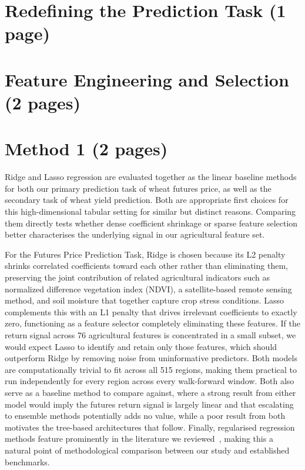 \documentclass[pdflatex,sn-mathphys-num, oneside]{sn-jnl}%
\theoremstyle{thmstyleone}%
\theoremstyle{thmstyletwo}%
\theoremstyle{thmstylethree}%
\begin{document}
\clearpage

\section{Redefining the Prediction Task (1 page)}\label{sec3}

\clearpage

\section{Feature Engineering and Selection (2 pages)}\label{sec3}

\clearpage

\section{Method 1 (2 pages)}\label{sec3}
Ridge and Lasso regression are evaluated together as the linear baseline methods for both our primary prediction task of wheat futures price, as well as the secondary task of wheat yield prediction. Both are appropriate first choices for this high-dimensional tabular setting for similar but distinct reasons. Comparing them directly tests whether dense coefficient shrinkage or sparse feature selection better characterises the underlying signal in our agricultural feature set.

For the Futures Price Prediction Task, Ridge is chosen because its L2 penalty shrinks correlated coefficients toward each other rather than eliminating them, preserving the joint contribution of related agricultural indicators such as normalized difference vegetation index (NDVI), a satellite-based remote sensing method, and soil moisture that together capture crop stress conditions. Lasso complements this with an L1 penalty that drives irrelevant coefficients to exactly zero, functioning as a feature selector completely eliminating these features. If the return signal across 76 agricultural features is concentrated in a small subset, we would expect Lasso to identify and retain only those features, which should outperform Ridge by removing noise from uninformative predictors. Both models are computationally trivial to fit across all 515 regions, making them practical to run independently for every region across every walk-forward window. Both also serve as a baseline method to compare against, where a strong result from either model would imply the futures return signal is largely linear and that escalating to ensemble methods potentially adds no value, while a poor result from both motivates the tree-based architectures that follow. Finally, regularised regression methods feature prominently in the literature we reviewed~\cite{bib14,bib16}, making this a natural point of methodological comparison between our study and established benchmarks.
\end{document}

